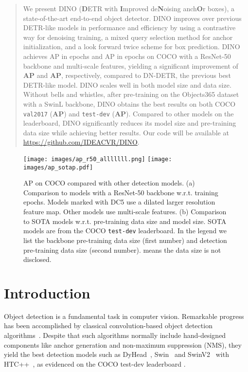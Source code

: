 \documentclass[runningheads]{llncs}
\newcommand{\modelname}{{DINO}}
\begin{document}
\begin{abstract}
We present  {\modelname} (\textbf{D}ETR with \textbf{I}mproved de\textbf{N}oising anch\textbf{O}r boxes), a state-of-the-art end-to-end object detector. DINO improves over previous DETR-like models in performance and efficiency by using a contrastive way for denoising training, a mixed query selection method for anchor initialization, and a look forward twice scheme for box prediction.
DINO achieves AP in  epochs and AP in  epochs on COCO with a ResNet-50 backbone and multi-scale features, yielding a significant improvement of \textbf{AP} and \textbf{AP}, respectively, compared to DN-DETR, the previous best DETR-like model. DINO scales well in both model size and data size. Without bells and whistles, after pre-training on the Objects365 dataset with a SwinL backbone, DINO obtains the best results on both COCO \texttt{val2017} (\textbf{AP}) and \texttt{test-dev} (\textbf{AP}). Compared to other models on the leaderboard, DINO significantly reduces its model size and pre-training data size while achieving better results. Our code will be available at \url{https://github.com/IDEACVR/DINO}.


\end{abstract}

\begin{figure}[ht]
    \centering
    \begin{center}
\texttt{[image: images/ap\_r50\_alllllll.png]}
\texttt{[image: images/ap\_sotap.pdf]}
\vspace{-0.4cm}
\end{center}
    \caption{AP on COCO compared with other detection models. (a) Comparison to models with a ResNet-50 backbone w.r.t. training epochs. Models marked with DC5 use a dilated larger resolution feature map. Other models use multi-scale features. (b) Comparison to SOTA models w.r.t. pre-training data size and model size. SOTA models are from the COCO  \texttt{test-dev} leaderboard. In the legend we list the backbone pre-training data size (first number) and detection pre-training data size (second number).  means the data size is not disclosed.
}
    \label{fig:intro}
\end{figure}
 

\section{Introduction}
Object detection is a fundamental task in computer vision. Remarkable progress has been accomplished by classical convolution-based object detection algorithms~\cite{RenHG017,tian2019fcos,lin2018focal,bochkovskiy2020yolov4,ge2021yolox}. Despite that such algorithms normally include hand-designed components like anchor generation and non-maximum suppression (NMS), they yield the best detection models such as DyHead~\cite{dai2021dynamic}, Swin~\cite{liu2021swin} and SwinV2~\cite{liu2021swinv2} with HTC++~\cite{chen2019hybrid}, as evidenced on the COCO test-dev leaderboard \cite{paperwithcode}.
\end{document}
